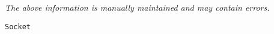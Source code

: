 \label{pkg:socket}

{\tiny \it The above information is manually maintained and may contain errors.}
\begin{verbatim}
Socket
\end{verbatim}
